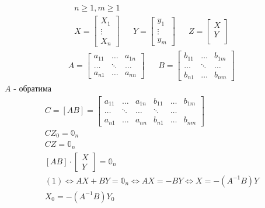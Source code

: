 \documentclass[main]{subfiles}
\begin{document}
      \begin{theorem}
         \begin{align*}
          n \geq 1, m \geq 1 \\
           X = \begin{bmatrix*}
            X_1 \\
            \vdots \\
            X_n
         \end{bmatrix*} &&  Y = \begin{bmatrix*}
            y_1 \\
            \vdots \\
            y_m
         \end{bmatrix*} &&
         Z = \begin{bmatrix*}
            X \\
            Y \\
         \end{bmatrix*} 
      \end{align*}
      \begin{align*}
         A = \begin{bmatrix*}
            a_{11} & \ldots & a_{1n} \\
            \ldots & \ddots & \ldots \\
            a_{n1} & \ldots & a_{nn}
         \end{bmatrix*} &&
         B = \begin{bmatrix*}
            b_{11} & \ldots & b_{1m} \\
            \ldots & \ddots & \ldots \\
            b_{n1} & \ldots & b_{nm}
         \end{bmatrix*} 
      \end{align*}
      $A$ - обратима
      \begin{gather*}
          C= [AB]  = \begin{bmatrix*}
            a_{11} & \ldots & a_{1n} & b_{11} & \ldots & b_{1m} \\
            \ldots & \ddots & \ldots & \ddots & \ldots \\
            a_{n1} & \ldots & a_{nn} & b_{n1} & \ldots & b_{nm}
         \end{bmatrix*} \\
       CZ_0 = \mathbb{0}_n \\
       CZ = \mathbb{0}_n \\
       [AB] \cdot \begin{bmatrix*}
         X \\
         Y
      \end{bmatrix*} = \mathbb{0}_n \tag{1} \\
      (1) \Leftrightarrow AX + BY = \mathbb{0}_n \Leftrightarrow AX = -BY \Leftrightarrow X
      = -(A^{-1}B)Y \tag{2}  \\
       X_0 = -(A^{-1}B)Y_0 \tag{2\prime} 
      \end{gather*}
      \end{theorem}
 
\end{document}

